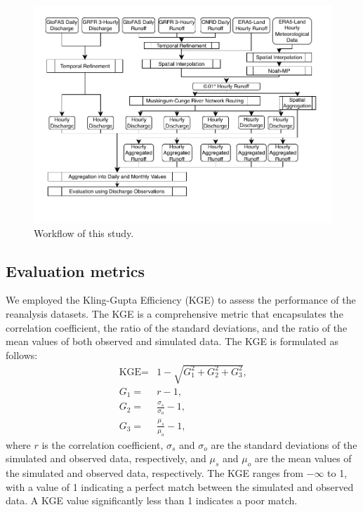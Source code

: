 \documentclass[preprint, review, authoryear, longtitle, 12pt, 3p]{elsarticle}
\begin{document}
\begin{figure}[ht!]
  \centering
  \includegraphics[width=\textwidth]{workflow.pdf}
  \caption{Workflow of this study.}
  \label{fig:workflow}
\end{figure}

\subsection{Evaluation metrics}

We employed the Kling-Gupta Efficiency (KGE) \citep{gupta2009JH} to assess the performance of the reanalysis datasets. The KGE is a comprehensive metric that encapsulates the correlation coefficient, the ratio of the standard deviations, and the ratio of the mean values of both observed and simulated data. The KGE is formulated as follows:
\begin{align}
  \label{eq:kge}
  \text{KGE} =& 1 - \sqrt{G_1^2 + G_2^2 + G_3^2} \text{,} \\
  G_1 =& r - 1 \text{,} \\
  G_2 =& \frac{\sigma_s}{\sigma_o} - 1 \text{,} \\
  G_3 =& \frac{\mu_s}{\mu_o} - 1 \text{,}
\end{align}
where $r$ is the correlation coefficient, $\sigma_s$ and $\sigma_o$ are the standard deviations of the simulated and observed data, respectively, and $\mu_s$ and $\mu_o$ are the mean values of the simulated and observed data, respectively. The KGE ranges from $-\infty$ to 1, with a value of 1 indicating a perfect match between the simulated and observed data. A KGE value significantly less than 1 indicates a poor match.
\end{document}
